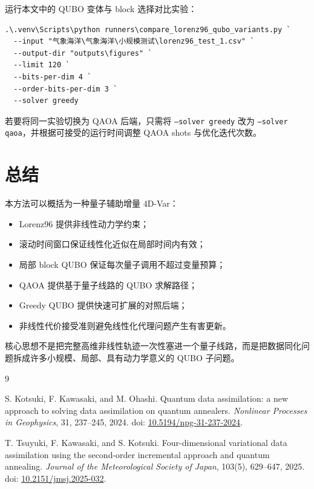 \documentclass[UTF8,a4paper,12pt]{ctexart}
\begin{document}
运行本文中的 QUBO 变体与 block 选择对比实验：
\begin{lstlisting}[style=cmd]
.\.venv\Scripts\python runners\compare_lorenz96_qubo_variants.py `
  --input "气象海洋\气象海洋\小规模测试\lorenz96_test_1.csv" `
  --output-dir "outputs\figures" `
  --limit 120 `
  --bits-per-dim 4 `
  --order-bits-per-dim 3 `
  --solver greedy
\end{lstlisting}

若要将同一实验切换为 QAOA 后端，只需将 \texttt{--solver greedy} 改为 \texttt{--solver qaoa}，并根据可接受的运行时间调整 QAOA shots 与优化迭代次数。

\section{总结}

本方法可以概括为一种量子辅助增量 4D-Var：

\begin{itemize}
  \item Lorenz96 提供非线性动力学约束；
  \item 滚动时间窗口保证线性化近似在局部时间内有效；
  \item 局部 block QUBO 保证每次量子调用不超过变量预算；
  \item QAOA 提供基于量子线路的 QUBO 求解路径；
  \item Greedy QUBO 提供快速可扩展的对照后端；
  \item 非线性代价接受准则避免线性化代理问题产生有害更新。
\end{itemize}

核心思想不是把完整高维非线性轨迹一次性塞进一个量子线路，而是把数据同化问题拆成许多小规模、局部、具有动力学意义的 QUBO 子问题。

\begin{thebibliography}{9}

S. Kotsuki, F. Kawasaki, and M. Ohashi.
\newblock Quantum data assimilation: a new approach to solving data assimilation on quantum annealers.
\newblock \emph{Nonlinear Processes in Geophysics}, 31, 237--245, 2024.
\newblock doi: \href{https://doi.org/10.5194/npg-31-237-2024}{10.5194/npg-31-237-2024}.

T. Tsuyuki, F. Kawasaki, and S. Kotsuki.
\newblock Four-dimensional variational data assimilation using the second-order incremental approach and quantum annealing.
\newblock \emph{Journal of the Meteorological Society of Japan}, 103(5), 629--647, 2025.
\newblock doi: \href{https://doi.org/10.2151/jmsj.2025-032}{10.2151/jmsj.2025-032}.

\end{thebibliography}
\end{document}
